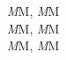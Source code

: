 \documentclass{article}
\begin{document}
	\noindent
	{\itshape M}M, {\slshape M}M\\
	{\itshape M\/}M, {\slshape M\/}M\\
	\textit{M}M, \textsl{M}M\\
\end{document}
